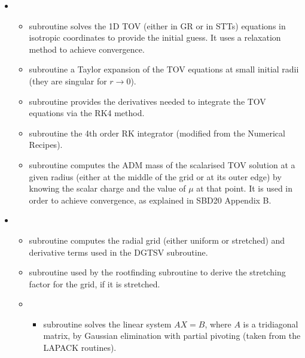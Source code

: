 \documentclass[letterpaper,10pt,english]{sphinxmanual}
\begin{document}
\begin{itemize}
\item {} 
\sphinxAtStartPar
{}
\begin{itemize}
\item {} 
\sphinxAtStartPar
subroutine  \sphinxhyphen{} solves the 1D TOV (either in GR or in STTs) equations in isotropic coordinates to provide the initial guess. It uses a relaxation method to achieve convergence.

\item {} 
\sphinxAtStartPar
subroutine  \sphinxhyphen{} a Taylor expansion of the TOV equations at small initial radii (they are
singular for \(r \rightarrow 0\)).

\item {} 
\sphinxAtStartPar
subroutine  \sphinxhyphen{} provides the derivatives needed to integrate the TOV equations via the
RK4 method.

\item {} 
\sphinxAtStartPar
subroutine  \sphinxhyphen{} the 4th order RK integrator (modified from the Numerical Recipes).

\item {} 
\sphinxAtStartPar
subroutine  \sphinxhyphen{} computes the ADM mass of the scalarised TOV solution at a given radius (either at the middle of the grid or at its outer edge) by knowing the scalar charge and the value of \(\mu\) at that point. It is used in order to achieve convergence, as explained in SBD20 Appendix B.


\end{itemize}

\item {} 
\sphinxAtStartPar
{}
\begin{itemize}
\item {} 
\sphinxAtStartPar
subroutine  \sphinxhyphen{} computes the radial grid (either uniform or stretched) and derivative terms used in the DGTSV subroutine.

\item {} 
\sphinxAtStartPar
subroutine  \sphinxhyphen{} used by the root\sphinxhyphen{}finding subroutine to derive the stretching factor for the grid, if it is stretched.


\item {} 
\sphinxAtStartPar
{}
\begin{itemize}
\item {} 
\sphinxAtStartPar
subroutine  \sphinxhyphen{} solves the linear system \(AX = B\), where \(A\) is a tridiagonal matrix, by
Gaussian elimination with partial pivoting (taken from the LAPACK routines).


\end{itemize}
\end{itemize}
\end{itemize}
\end{document}

